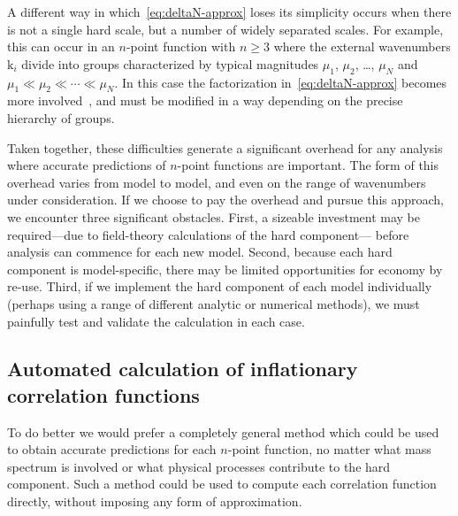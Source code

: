 \documentclass[11pt,a4paper]{article}
\newcommand{\vect}[1]{\bm{\mathrm{{#1}}}}
\renewcommand{\geq}{\geqslant}
\begin{document}
A different way in which~\eqref{eq:deltaN-approx}
loses its simplicity
occurs when there is not a single hard scale,
but a number of widely separated scales.
For example, this can occur in an $n$-point function
with $n \geq 3$
where the external wavenumbers $\vect{k}_i$
divide into groups characterized by typical
magnitudes $\mu_1$, $\mu_2$, \ldots, $\mu_N$
and $\mu_1 \ll \mu_2 \ll \cdots \ll \mu_N$.
In this case the factorization in~\eqref{eq:deltaN-approx}
becomes more involved~\cite{Kenton:2015lxa},
and must be modified in a way depending on the precise
hierarchy of groups.

Taken together, these difficulties generate a significant
overhead
for any analysis where accurate predictions of
$n$-point functions are important.
The form of this overhead varies from model to model,
and even on the range of wavenumbers under consideration.
If we choose to pay the overhead 
and pursue this approach, we encounter three
significant obstacles.
First, a sizeable investment may be required---due to field-theory
calculations
of the hard component---%
before analysis can commence for each new model.
Second, because each hard component is model-specific, there
may be limited opportunities for economy by re-use.
Third, if we implement the hard component of each model
individually (perhaps using a range of different
analytic or numerical methods), we must painfully test and validate
the calculation in each case.

\subsection{Automated calculation of inflationary correlation functions}
To do better we would prefer a completely general method
which could be used to obtain accurate predictions for each $n$-point
function, no matter what mass spectrum
is involved or what physical
processes contribute to the hard component.
Such a method could be used to compute each correlation function directly,
without imposing any form of approximation.
\end{document}
